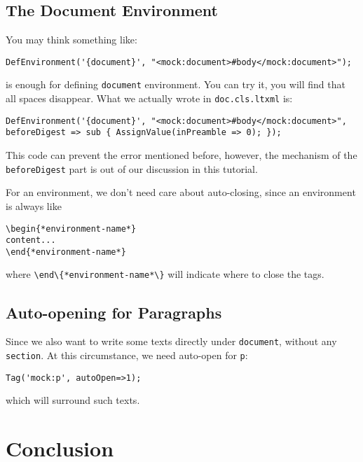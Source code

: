 \documentclass[a4paper]{article}
\begin{document}
\subsection{The Document Environment}
You may think something like:
\begin{lstlisting}
DefEnvironment('{document}', "<mock:document>#body</mock:document>");
\end{lstlisting}
is enough for defining \lstinline|document| environment. You can try it, you will find that all spaces disappear. What we actually wrote in \lstinline|doc.cls.ltxml| is:
\begin{lstlisting}
DefEnvironment('{document}', "<mock:document>#body</mock:document>", beforeDigest => sub { AssignValue(inPreamble => 0); });
\end{lstlisting}
This code can prevent the error mentioned before, however, the mechanism of the \lstinline|beforeDigest| part is out of our discussion in this tutorial.

 For an environment, we don't need care about auto-closing, since an environment is always like
\begin{lstlisting}
\begin{*environment-name*}
content...
\end{*environment-name*}
\end{lstlisting}
where \lstinline|\end\{*environment-name*\}| will indicate where to close the tags.

\subsection{Auto-opening for Paragraphs}
Since we also want to write some texts directly under \lstinline|document|, without any \lstinline|section|. At this circumstance, we need auto-open for \lstinline|p|:
\begin{lstlisting}
Tag('mock:p', autoOpen=>1);
\end{lstlisting}
which will surround such texts.

\section{Conclusion}\label{sec:concl}
\printbibliography
\newpage
\end{document}
